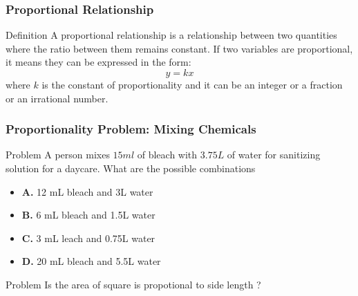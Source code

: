 \documentclass{beamer}
\begin{document}
\begin{frame}
    \frametitle{Proportional Relationship}

    \begin{block}{Definition}
        A proportional relationship is a relationship between two quantities where the ratio between them remains constant. 
        If two variables are proportional, it means they can be expressed in the form:
        $$ y = kx $$
        where $ k $ is the constant of proportionality and it can be an integer or a fraction or an irrational number.
    \end{block}
\end{frame}

\begin{frame}
    \frametitle{Proportionality Problem: Mixing Chemicals}

    \begin{block}{Problem}
        A person mixes $15 ml$ of bleach with $3.75 L$ of water for sanitizing solution for a daycare. What are the possible combinations 
    \end{block}

    \begin{itemize}
        \item \textbf{A.} 12 mL bleach and 3L water
        \item \textbf{B.} 6 mL bleach and 1.5L water
        \item \textbf{C.} 3 mL leach and 0.75L water
        \item \textbf{D.} 20 mL bleach and 5.5L water
    \end{itemize}
    \begin{block}{Problem}
        Is the area of square is propotional to side length ?
    \end{block}
\end{frame}
\end{document}
